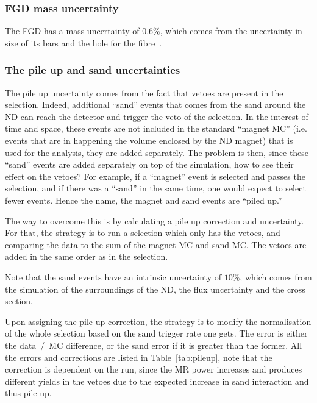 \subsubsection{\Gls{FGD} mass uncertainty}
\label{subsec:fgdmass}
The \Gls{FGD} has a mass uncertainty of $0.6\%$, which comes from the
uncertainty in size of its bars and the hole for the
fibre~\cite{TN212}.

\subsubsection{The pile up and sand uncertainties}
\label{subsec:pileup}
The pile up uncertainty comes from the fact that vetoes are present in
the selection. Indeed, additional ``\gls{sand}'' events that comes
from the sand around the \Gls{ND} can reach the detector and trigger
the veto of the selection. In the interest of time and space, these
events are not included in the standard ``\gls{magnet} \Gls{MC}''
(i.e. events that are in happening the volume enclosed by the \Gls{ND}
magnet) that is used for the analysis, they are added separately. The
problem is then, since these ``\gls{sand}'' events are added
separately on top of the simulation, how to see their effect on the
vetoes? For example, if a ``\gls{magnet}'' event is selected and
passes the selection, and if there was a ``\gls{sand}'' in the same
time, one would expect to select fewer events. Hence the name, the
magnet and sand events are ``piled up.''

The way to overcome this is by calculating a pile up correction and
uncertainty. For that, the strategy is to run a selection which only
has the vetoes, and comparing the data to the sum of the \gls{magnet}
\Gls{MC} and \gls{sand} \Gls{MC}. The vetoes are added in the same
order as in the selection.

Note that the \gls{sand} events have an intrinsic uncertainty of
$10\%$, which comes from the simulation of the surroundings of the
\Gls{ND}, the flux uncertainty and the cross section.

Upon assigning the pile up correction, the strategy is to modify the
normalisation of the whole selection based on the \gls{sand} trigger
rate one gets. The error is either the data~/~\Gls{MC} difference, or
the \gls{sand} error if it is greater than the former. All the errors
and corrections are listed in Table~\ref{tab:pileup}, note that the
correction is dependent on the run, since the \Gls{MR} power increases
and produces different yields in the vetoes due to the expected
increase in \gls{sand} interaction and thus pile up.

